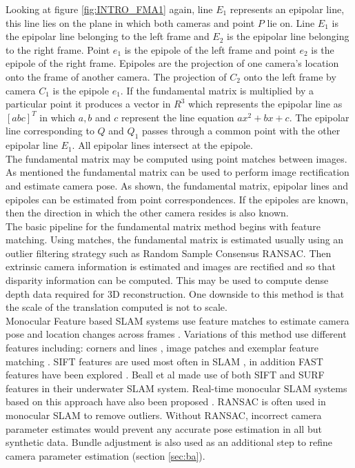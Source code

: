 Looking at figure \ref{fig:INTRO_FMA1} again, line $E_1$ represents an epipolar line, this line lies on the plane in which both cameras and point $P$ lie on. Line $E_1$ is the epipolar line belonging to the left frame and $E_2$ is the epipolar line belonging to the right frame. Point $e_1$ is the epipole of the left frame and point $e_2$ is the epipole of the right frame. Epipoles are the projection of one camera's location onto the frame of another camera. The projection of $C_2$ onto the left frame by camera $C_1$ is the epipole $e_1$. If the fundamental matrix is multiplied by a particular point it produces a vector in $R^3$ which represents the epipolar line as $[a b c]^T$ in which $a,b$ and $c$ represent the line equation $ax^2 + bx + c$. The epipolar line corresponding to $Q$ and $Q_1$ passes through a common point with the other epipolar line $E_1$. All epipolar lines intersect at the epipole. \\

The fundamental matrix may be computed using point matches between images. As mentioned the fundamental matrix can be used to perform image rectification and estimate camera pose. As shown, the fundamental matrix, epipolar lines and epipoles can be estimated from point correspondences. If the epipoles are known, then the direction in which the other camera resides is also known. \\

The basic pipeline for the fundamental matrix method begins with feature matching. Using matches, the fundamental matrix is estimated usually using an outlier filtering strategy such as Random Sample Consensus RANSAC. Then extrinsic camera information is estimated and images are rectified and so that disparity information can be computed. This may be used to compute dense depth data required for 3D reconstruction. One downside to this method is that the scale of the translation computed is not to scale. \\


Monocular Feature based SLAM systems use feature matches to estimate camera pose and location changes across frames \cite{Davison02Simultaneous}. Variations of this method use different features including: corners and lines \cite{Jeong06Visual}, image patches \cite{Silveira08Efficient} and exemplar feature matching \cite{Chekhlov07Robust}. SIFT features are used most often in SLAM \cite{Jensfelt06Framework,Pollefeys08Detailed,Beall11Bundle,Eudes10Fast}, in addition FAST features have been explored \cite{Kundu10Realtime,Leelasawassuk133d,Konolige10View,Konolige08Frameslam}. Beall et al \cite{Beall11Bundle} made use of both SIFT and SURF features in their underwater SLAM system. Real-time monocular SLAM systems based on this approach have also been proposed \cite{Chekhlov07Robust,Pollefeys08Detailed}. RANSAC is often used in monocular SLAM \cite{Eudes10Fast,Kundu10Realtime,Konolige10View,Konolige08Frameslam,Pradeep13Monofusion} to remove outliers. Without RANSAC, incorrect camera parameter estimates would prevent any accurate pose estimation in all but synthetic data. Bundle adjustment is also used as an additional step to refine camera parameter estimation \cite{Eudes10Fast} (section \ref{sec:ba}).  \\


